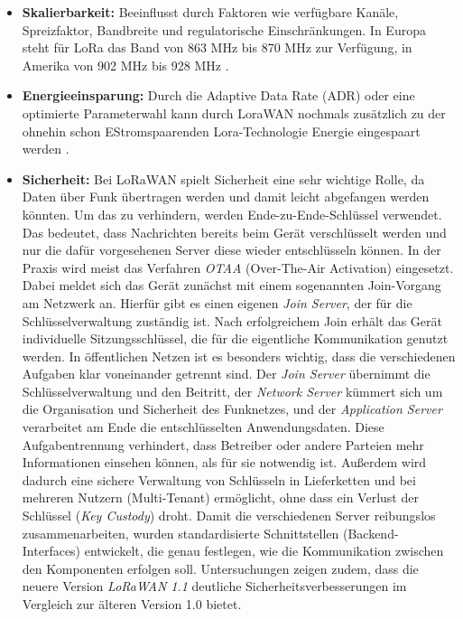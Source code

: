 \begin{itemize}
    \item \textbf{Skalierbarkeit:} Beeinflusst durch Faktoren wie verfügbare Kanäle, Spreizfaktor, Bandbreite und regulatorische Einschränkungen. In Europa steht für LoRa das Band von 863 MHz bis 870 MHz zur Verfügung, in Amerika von 902 MHz bis 928 MHz \autocite{FrequencyPlans}.
    
    \item \textbf{Energieeinsparung:} Durch die Adaptive Data Rate (ADR) oder eine optimierte Parameterwahl kann durch LoraWAN nochmals zusätzlich zu der ohnehin schon EStromspaarenden Lora-Technologie Energie eingespaart werden \autocite{kufakunesuSurveyAdaptiveData2020}.
    
    \item \textbf{Sicherheit:} Bei LoRaWAN spielt Sicherheit eine sehr wichtige Rolle, da Daten über Funk übertragen werden und damit leicht abgefangen werden könnten. Um das zu verhindern, werden Ende-zu-Ende-Schlüssel verwendet. Das bedeutet, dass Nachrichten bereits beim Gerät verschlüsselt werden und nur die dafür vorgesehenen Server diese wieder entschlüsseln können.  In der Praxis wird meist das Verfahren \emph{OTAA} (Over-The-Air Activation) eingesetzt. Dabei meldet sich das Gerät zunächst mit einem sogenannten Join-Vorgang am Netzwerk an. Hierfür gibt es einen eigenen \emph{Join Server}, der für die Schlüsselverwaltung zuständig ist. Nach erfolgreichem Join erhält das Gerät individuelle Sitzungsschlüssel, die für die eigentliche Kommunikation genutzt werden.  In öffentlichen Netzen ist es besonders wichtig, dass die verschiedenen Aufgaben klar voneinander getrennt sind. Der \emph{Join Server} übernimmt die Schlüsselverwaltung und den Beitritt, der \emph{Network Server} kümmert sich um die Organisation und Sicherheit des Funknetzes, und der \emph{Application Server} verarbeitet am Ende die entschlüsselten Anwendungsdaten. Diese Aufgabentrennung verhindert, dass Betreiber oder andere Parteien mehr Informationen einsehen können, als für sie notwendig ist. Außerdem wird dadurch eine sichere Verwaltung von Schlüsseln in Lieferketten und bei mehreren Nutzern (Multi-Tenant) ermöglicht, ohne dass ein Verlust der Schlüssel (\emph{Key Custody}) droht.  Damit die verschiedenen Server reibungslos zusammenarbeiten, wurden standardisierte Schnittstellen (Backend-Interfaces) entwickelt, die genau festlegen, wie die Kommunikation zwischen den Komponenten erfolgen soll. Untersuchungen zeigen zudem, dass die neuere Version \emph{LoRaWAN 1.1} deutliche Sicherheitsverbesserungen im Vergleich zur älteren Version 1.0 bietet. \autocite{butun2019security, LoRaWANBackendInterfaces11}

\end{itemize}

